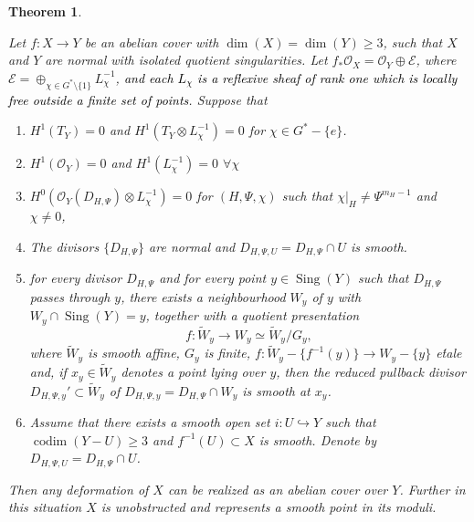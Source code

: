 \documentclass[12pt,twoside,]{amsart}
\theoremstyle{plain}
\newtheorem{theorem}{Theorem}[subsection]
\theoremstyle{definition}
\begin{document}
\begin{theorem}\label{every def is an abelian cover}

Let $f: X \to Y$ be an abelian cover with $\operatorname{dim}(X) = \operatorname{dim}(Y) \geq 3$, such that $X$ and $Y$ are normal with isolated quotient singularities. Let $f_*\mathcal{O}_X = \mathcal{O}_Y \oplus \mathcal{E}$, where $\mathcal{E} = \oplus_{\chi \in G^* \setminus \{1\}} L_{\chi}^{-1}$, %
\textcolor{black}{and each $L_{\chi}$ is a reflexive sheaf of rank one which is locally free outside a finite set of points}. Suppose that 
       \begin{enumerate}
        \item $H^1(T_Y) = 0$ and $ H^1(T_Y \otimes L_{\chi}^{-1}) = 0 $ for $\chi \in G^*-\{e\}$.
        \item $H^1(\mathcal{O}_Y) = 0$ and $H^1(L_{\chi}^{-1}) = 0$ $\forall \chi$
        \item $H^0(\mathcal{O}_Y(D_{H,\Psi}) \otimes L_{\chi}^{-1}) = 0$ for $(H,\Psi, \chi)$ such that $\chi|_H \neq \Psi^{m_H-1}$ and $\chi \neq 0$,
        \item The divisors $\{D_{H,\Psi}\}$ are normal and $D_{H,\Psi, U} = D_{H,\Psi} \cap U$ is smooth.
        \item for every divisor $D_{H,\Psi}$ and for every point
        $y\in \operatorname{Sing}(Y)$ such that $D_{H,\Psi}$ passes through $y$, there exists a neighbourhood $W_y$ of $y$ with $W_y \cap \operatorname{Sing}(Y) = y$, together with a
        quotient presentation
       \[
       f: \widetilde{W}_y \to W_y \simeq \widetilde{W}_y/G_y,
       \]
       where $\widetilde{W}_y$ is smooth affine, $G_y$ is finite, $f: \widetilde{W}_y- \{f^{-1}(y)\} \to W_y- \{y\}$ e\'tale
        and, if  $x_y\in \widetilde{W}_y$ denotes a point lying over $y$, then the reduced pullback
        divisor $D_{H,\Psi,y}'\subset \widetilde{W}_y$ of $D_{H,\Psi,y} = D_{H,\Psi} \cap W_y$  is smooth at $x_y$.
        \item Assume that there exists a smooth open set $i: U \hookrightarrow Y$ such that $\operatorname{codim}(Y-U) \geq 3$ and $f^{-1}(U) \subset X$ is smooth. Denote by $D_{H,\Psi, U} = D_{H,\Psi} \cap U$.
        \end{enumerate}
Then any deformation of $X$ can be realized as an abelian cover over $Y$. Further in this situation $X$ is unobstructed and represents a smooth point in its moduli.
\end{theorem}
\end{document}
